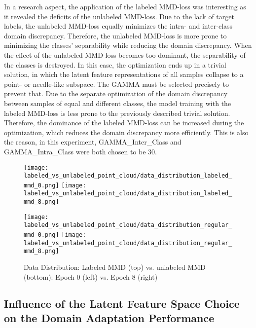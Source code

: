 In a  research aspect, the application of the labeled MMD-loss was interesting as it revealed the deficits of the unlabeled MMD-loss. Due to the lack of target labels, the unlabeled MMD-loss equally minimizes the intra- and inter-class domain discrepancy. Therefore, the unlabeled MMD-loss is more prone to minimizing the classes' separability while reducing the domain discrepancy. When the effect of the unlabeled MMD-loss becomes too dominant, the separability of the classes is destroyed. In this case, the optimization ends up in a trivial solution, in which the latent feature representations of all samples collapse to a point- or needle-like subspace. The GAMMA must be selected precisely to prevent that. Due to the separate optimization of the domain discrepancy between samples of equal and different classes, the model training with the labeled MMD-loss is less prone to the previously described trivial solution. Therefore, the dominance of the labeled MMD-loss can be increased during the optimization, which reduces the domain discrepancy more efficiently. This is also the reason, in this experiment, GAMMA\_Inter\_Class and GAMMA\_Intra\_Class were both chosen to be 30.


\begin{figure}[htp]
  \centering
  \texttt{[image: labeled\_vs\_unlabeled\_point\_cloud/data\_distribution\_labeled\_mmd\_0.png]}
  \hspace{.4cm}
  \texttt{[image: labeled\_vs\_unlabeled\_point\_cloud/data\_distribution\_labeled\_mmd\_8.png]}

  \vspace{.1cm}

  \texttt{[image: labeled\_vs\_unlabeled\_point\_cloud/data\_distribution\_regular\_mmd\_0.png]}
  \hspace{.4cm}
  \texttt{[image: labeled\_vs\_unlabeled\_point\_cloud/data\_distribution\_regular\_mmd\_8.png]}
  
  \caption{Data Distribution: Labeled MMD (top) vs. unlabeled MMD (bottom): Epoch 0 (left) vs. Epoch 8 (right)}
  \label{fig:point_cloud_labeled_unlabeled_mmd}
\end{figure}

\subsection{Influence of the Latent Feature Space Choice on the Domain Adaptation Performance}
\label{cnn_mmd_dummy}

